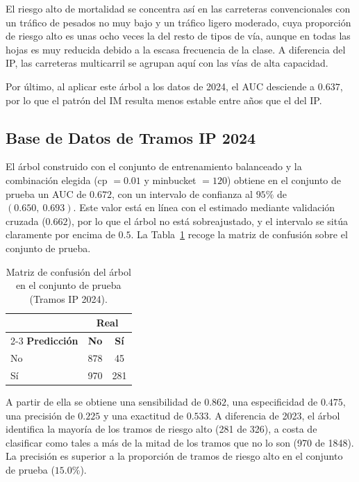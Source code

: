 \documentclass[twoside,a4paper,12pt,onecolumn,openany]{book}
\begin{document}
El riesgo alto de mortalidad se concentra así en las carreteras convencionales con un tráfico de pesados no muy bajo y un tráfico ligero moderado, cuya proporción de riesgo alto es unas ocho veces la del resto de tipos de vía, aunque en todas las hojas es muy reducida debido a la escasa frecuencia de la clase. A diferencia del IP, las carreteras multicarril se agrupan aquí con las vías de alta capacidad.
 
\vspace{0.5cm}
 
Por último, al aplicar este árbol a los datos de 2024, el AUC desciende a $0.637$, por lo que el patrón del IM resulta menos estable entre años que el del IP.
 
\subsection{Base de Datos de Tramos IP 2024}
 
El árbol construido con el conjunto de entrenamiento balanceado y la combinación elegida (cp $=0.01$ y minbucket $=120$) obtiene en el conjunto de prueba un AUC de $0.672$, con un intervalo de confianza al $95\%$ de $(0.650,\ 0.693)$. Este valor está en línea con el estimado mediante validación cruzada ($0.662$), por lo que el árbol no está sobreajustado, y el intervalo se sitúa claramente por encima de $0.5$. La Tabla~\ref{tab:confusion_ip_2024} recoge la matriz de confusión sobre el conjunto de prueba.
 
\begin{table}[H]
    \centering
    \vspace{0.3cm}
    \renewcommand{\arraystretch}{1.3}
    \begin{tabular}{lcc}
        \toprule
        & \multicolumn{2}{c}{\textbf{Real}} \\
        \cmidrule(lr){2-3}
        \textbf{Predicción} & \textbf{No} & \textbf{Sí} \\
        \midrule
        No & 878 & 45  \\
        Sí & 970 & 281 \\
        \bottomrule
    \end{tabular}
    \caption{Matriz de confusión del árbol en el conjunto de prueba (Tramos IP 2024).}
    \label{tab:confusion_ip_2024}
\end{table}
 
\vspace{0.5cm}
 
A partir de ella se obtiene una sensibilidad de $0.862$, una especificidad de $0.475$, una precisión de $0.225$ y una exactitud de $0.533$. A diferencia de 2023, el árbol identifica la mayoría de los tramos de riesgo alto (281 de 326), a costa de clasificar como tales a más de la mitad de los tramos que no lo son (970 de 1848). La precisión es superior a la proporción de tramos de riesgo alto en el conjunto de prueba ($15.0\%$).
 
\end{document}
